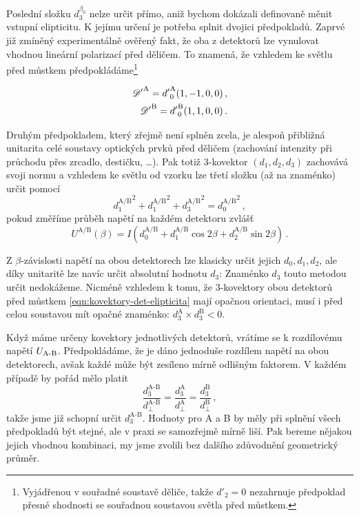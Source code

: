 Poslední složku $d^{\beta_0}_3$ nelze určit přímo, aniž bychom dokázali definovaně měnit vstupní elipticitu.
K jejímu určení je potřeba splnit dvojici předpokladů.
Zaprvé již zmíněný experimentálně ověřený fakt, že oba z detektorů lze vynulovat vhodnou lineární polarizací před děličem.
To znamená, že vzhledem ke světlu před můstkem předpokládáme\footnote{Vyjádřenou v souřadné soustavě děliče, takže $d'_2=0$ nezahrnuje předpoklad přesné shodnosti se souřadnou soustavou světla před můstkem.}

\begin{align}
\label{eqn:kovektory-det-elipticita}
{\mathscr{D}'}^\textrm{A} = {d'}^{\textrm{A}}_0(1, -1, 0, 0) \,,\\
{\mathscr{D}'}^\textrm{B} = {d'}^\textrm{B}_0(1, 1, 0, 0) \,.
\end{align}

Druhým předpokladem, který zřejmě není splněn zcela, je alespoň přibližná unitarita celé soustavy optických prvků před děličem (zachování intenzity při průchodu přes zrcadlo, destičku, \ldots).
Pak totiž 3-kovektor $(d_1, d_2, d_3)$ zachovává svoji normu a vzhledem ke světlu od vzorku lze třetí složku (až na znaménko) určit pomocí
\begin{equation}
{d_1^\textrm{A/B}}^2 +  {d_1^\textrm{A/B}}^2 + {d_3^\textrm{A/B}}^2 = {d_0^\textrm{A/B}}^2 \,,
\end{equation}
pokud změříme průběh napětí na každém detektoru zvlášť
\begin{equation}
    U^\textrm{A/B}(\beta) = I \left( d^\textrm{A/B}_0 + d^\textrm{A/B}_1 \cos2\beta + d^\textrm{A/B}_2 \sin2\beta  \right) \,.
\end{equation}

Z $\beta$-závislosti napětí na obou detektorech lze klasicky určit jejich $d_0, d_1, d_2$, ale díky unitaritě lze navíc určit absolutní hodnotu $d_3$:
Znaménko $d_3$ touto metodou určit nedokážeme.
Nicméně vzhledem k tomu, že 3-kovektory obou detektorů před můstkem \eqref{eqn:kovektory-det-elipticita} mají opačnou orientaci, musí i před celou soustavou mít opačné znaménko: $d^\textrm{A}_3 \times d^\textrm{B}_3 < 0$.

Když máme určeny kovektory jednotlivých detektorů, vrátíme se k rozdílovému napětí $U_\textrm{A-B}$.
Předpokládáme, že je dáno jednoduše rozdílem napětí na obou detektorech, avšak každé může být zesíleno mírně odlišným faktorem.
V každém případě by pořád mělo platit
\begin{equation}
    \frac{d^\textrm{A-B}_3}{d^\textrm{A-B}_\perp} = \frac{d^\textrm{A}_3}{d^\textrm{A}_\perp} = \frac{d^\textrm{B}_3}{d^\textrm{B}_\perp} \,,
\end{equation}
takže jsme již schopní určit $d^\textrm{A-B}_3$.
Hodnoty pro A a B by měly při splnění všech předpokladů být stejné, ale v praxi se samozřejmě mírně liší.
Pak bereme nějakou jejich vhodnou kombinaci, my jsme zvolili bez dalšího zdůvodnění geometrický průměr.


